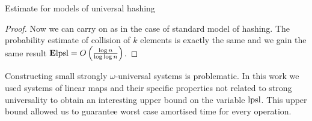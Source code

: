 \begin{section}{Estimate for models of universal hashing}
\begin{proof}
Now we can carry on as in the case of standard model of hashing. The probability estimate of collision of $k$ elements is exactly the same and we gain the same result $\mathbf{E} \mathrm{lpsl} = O\left(\frac{\log n}{\log \log n}\right)$.
\end{proof}

Constructing small strongly $\omega$-universal systems is problematic. In this work we used systems of linear maps and their specific properties not related to strong universality to obtain an interesting upper bound on the variable $\mathrm{lpsl}$. This upper bound allowed us to guarantee worst case amortised time for every operation.
\end{section}
